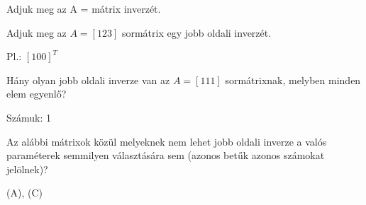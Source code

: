 \begin{frame}
  \begin{tcolorbox}[title={6/5. {\symknight}}]
     Adjuk meg az A = mátrix inverzét.
  \tcblower

    \mmedskip 
    
    
  \end{tcolorbox}
\end{frame}


\begin{frame}
  \begin{tcolorbox}[title={6/6. {\symknight}}]
     Adjuk meg az $A = [1 2 3]$ sormátrix egy jobb oldali inverzét.
  \tcblower

    \mmedskip 
    
     Pl.: $[1 0 0]^T$
  \end{tcolorbox}
\end{frame}


\begin{frame}
  \begin{tcolorbox}[title={6/7. {\symknight}}]
     Hány olyan jobb oldali inverze van az $A = [1 1 1]$ sormátrixnak, melyben minden elem egyenlő?
  \tcblower

    \mmedskip 
    
     Számuk: 1
  \end{tcolorbox}
\end{frame}


\begin{frame}
  \begin{tcolorbox}[title={6/8. {\symqueen}}]
     Az alábbi mátrixok közül melyeknek nem lehet jobb oldali inverze a valós paraméterek semmilyen választására sem (azonos betűk azonos számokat jelölnek)? 
     

  \tcblower

    \mmedskip 
    
     (A), (C)
  \end{tcolorbox}
\end{frame}


